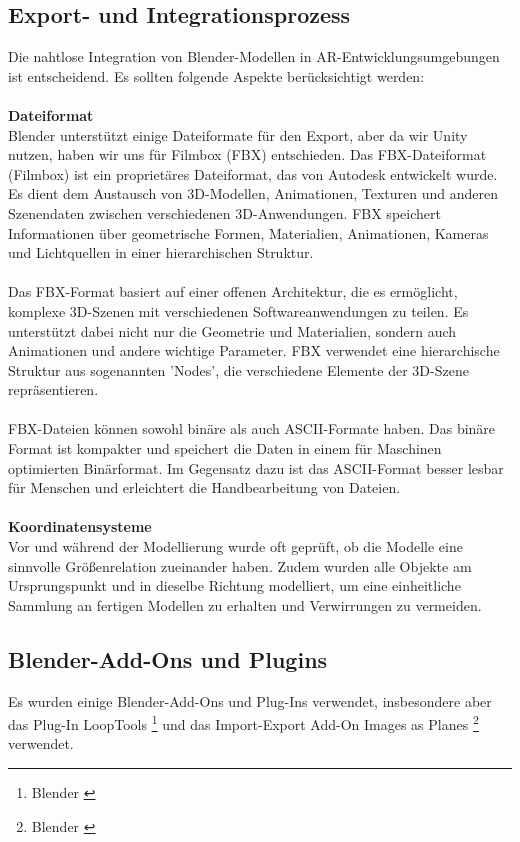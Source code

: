 \subsection{Export- und Integrationsprozess}
Die nahtlose Integration von Blender-Modellen in AR-Entwicklungsumgebungen ist entscheidend. Es sollten folgende
Aspekte berücksichtigt werden:\\
\\
\textbf{Dateiformat}\\
Blender unterstützt einige Dateiformate für den Export, aber da wir Unity nutzen, haben wir uns für Filmbox (FBX)
entschieden. Das FBX-Dateiformat (Filmbox) ist ein proprietäres Dateiformat, das von Autodesk entwickelt
wurde. Es dient dem Austausch von 3D-Modellen, Animationen, Texturen und anderen Szenendaten zwischen verschiedenen
3D-Anwendungen. FBX speichert Informationen über geometrische Formen, Materialien, Animationen, Kameras und
Lichtquellen in einer hierarchischen Struktur.\\
\\
Das FBX-Format basiert auf einer offenen Architektur, die es ermöglicht, komplexe 3D-Szenen mit verschiedenen
Softwareanwendungen zu teilen. Es unterstützt dabei nicht nur die Geometrie und Materialien, sondern auch Animationen
und andere wichtige Parameter. FBX verwendet eine hierarchische Struktur aus sogenannten 'Nodes', die verschiedene
Elemente der 3D-Szene repräsentieren.\\
\\
FBX-Dateien können sowohl binäre als auch ASCII-Formate haben. Das binäre Format ist kompakter und speichert die
Daten in einem für Maschinen optimierten Binärformat. Im Gegensatz dazu ist das ASCII-Format besser lesbar für
Menschen und erleichtert die Handbearbeitung von Dateien.\\
\\
\textbf{Koordinatensysteme}\\
Vor und während der Modellierung wurde oft geprüft, ob die Modelle eine sinnvolle Größenrelation zueinander haben.
Zudem wurden alle Objekte am Ursprungspunkt und in dieselbe Richtung modelliert, um eine einheitliche Sammlung an
fertigen Modellen zu erhalten und Verwirrungen zu vermeiden.


\subsection{Blender-Add-Ons und Plugins}
Es wurden einige Blender-Add-Ons und Plug-Ins verwendet, insbesondere aber das Plug-In LoopTools \footnote{Blender \cite{LoopTools}}
und das Import-Export Add-On Images as Planes \footnote{Blender \cite{Images as Planes}} verwendet.

